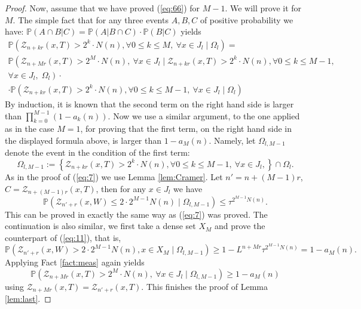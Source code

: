 \documentclass[amssymb,amsfonts,12pt,verbatim,righttag,oneside]{amsart}
\numberwithin{equation}{section} %
\theoremstyle{plain}
\newcommand*{\pr}{\ensuremath{\mathbb{P}}}
\newcommand*{\Z}{\ensuremath{\mathcal{Z}}}
\newcommand*{\HH}{\ensuremath{T}}
\theoremstyle{plain}
\begin{document}
\begin{proof}
Now, assume that we have proved (\ref{eq:66}) for $M-1$. We will prove it for $M$.
 The simple fact that for any three events $A,B,C$ of positive probability we have:  $\mathbb{P}(A\cap B|C)=\mathbb{P}\left(A|B\cap C\right)\cdot
\mathbb{P}\left(B|C\right)$ yields
\begin{multline*}
  \pr\left(\Z_{n+kr}(x,\HH)>2^k\! \cdot N(n),\forall 0\leq k\leq M,\ \forall x\in J_l\mid
  \Omega_l \right)=
\\
\pr\left(\Z_{n+Mr}(x,\HH)>2^M\cdot N(n),\ \forall x\in J_l\mid \Z_{n+kr}(x,\HH)>2^k\! \cdot
N(n),\forall 0\leq k\leq M-1,\right.
\\
\left.
\forall x\in J_l, \; \Omega_l \right)\cdot
\\
\cdot\pr\left( \Z_{n+kr}(x,\HH)>2^k\! \cdot N(n),\forall 0\leq k\leq M-1,\ \forall x\in J_l\mid
\Omega_l \right)
\end{multline*}
By induction, it is known that the second term on the right hand side is larger than
$\prod_{k=0}^{M-1}(1-a_k(n))$.
Now we use a similar argument, to the one
 applied as in the case $M=1$, for proving that the first term, on the right hand side in the displayed formula above, is larger than
$1-a_M(n)$. Namely, let $\Omega_{l,M-1}$ denote the event in the condition of the first
term:
\begin{equation*}
 \Omega_{l,M-1}:=\left\{\Z_{n+kr}(x,\HH)>2^k\! \cdot N(n),\forall 0\leq k\leq M-1,\ \forall
 x\in J_l, \right\}\cap \Omega_l.
\end{equation*}
As in the proof of (\ref{eq:7}) we use Lemma \ref{lem:Cramer}.  Let $n'=n+(M-1)r$,
$C=\Z_{n+(M-1)r}(x,\HH)$, then for any $x\in J_l$ we have
\begin{equation*}
\pr \left(\Z_{n'+r}(x,W)\leq 2\cdot 2^{M-1} N(n)\mid \Omega_{l,M-1} \right)\leq \tau
^{2^{M-1}N(n)}.
\end{equation*}
This can be proved in exactly the same way as (\ref{eq:7}) was proved. The continuation is also
similar, we first take a dense set $X_M$ and prove the counterpart of (\ref{eq:11}), that is,
\begin{equation*}
 \pr \left( \Z_{n'+r}(x,W)> 2 \cdot 2^{M-1}N(n),x\in X_M \mid \Omega_{l,M-1}\right)\geq
 1-L^{n+Mr}\tau^{2^{M-1}N(n)}=1-a_M(n).
\end{equation*}
Applying Fact \ref{fact:meas} again yields
\begin{equation*}
 \pr\left(\Z_{n+Mr}(x,\HH)>2^M\cdot N(n),\ \forall x\in J_l\mid \Omega_{l,M-1}\right)\geq
 1-a_M(n)
\end{equation*}
using $\Z_{n+Mr}(x,\HH)=\Z_{n'+r}(x,\HH)$. This finishes the proof of Lemma \ref{lem:last}.
\end{proof}
\end{document}
